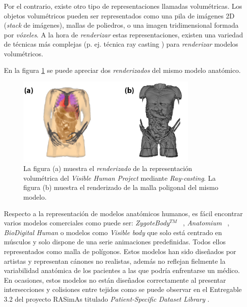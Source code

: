 Por el contrario, 
existe otro tipo de representaciones  llamadas volumétricas. Los objetos volumétricos pueden ser representados como una pila de imágenes 2D (\emph{stack} de imágenes), mallas de poliedros, o una imagen  tridimensional formada por \emph{vóxeles}. A la hora de \emph{renderizar} estas representaciones, existen una variedad de técnicas más complejas (p. ej. técnica ray casting \cite{isabel}) para \emph{renderizar} modelos volumétricos.


En la figura \ref{fig:HVP} se puede apreciar dos \emph{renderizados} del mismo modelo anatómico.

\begin{figure}[h]
   \centering
    \includegraphics[width=0.8\textwidth]{IMG/volvsb-rep.png}
    \caption{La figura (a) muestra el \emph{renderizado} de la representación volumétrica del \emph{Visible Human Project}\cite{ackerman1998visible} mediante \emph{Ray-casting}. La figura (b) muestra el renderizado de la malla poligonal del mismo modelo. }
   \label{fig:HVP}
\end{figure}



Respecto a la representación de modelos anatómicos humanos, es fácil encontrar  varios modelos comerciales como puede ser: \emph{ZygoteBody}$^{TM}$ ~\cite{kelc2012zygote}, \emph{Anatomium} ~\cite{Anatomium}, \emph{BioDigital Human} \cite{qualter2012biodigital} o modelos como \emph{Visible body}\cite{visible2012visible} que solo está centrado en músculos y solo dispone de una serie animaciones predefinidas. Todos ellos representados como malla de polígonos. Estos modelos han sido diseñados por artistas y representan cánones no realistas, además no reflejan fielmente la variabilidad anatómica de los pacientes a las que podría enfrentarse un médico. En ocasiones, estos modelos no están diseñados correctamente al presentar intersecciones y colisiones entre tejidos como se puede observar en el Entregable 3.2 del proyecto \ac{RASimAs} titulado \emph{Patient-Specific Dataset Library} \cite{ded3.2}.


